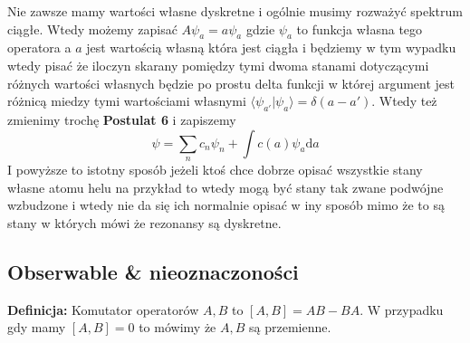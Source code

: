Nie zawsze mamy wartości własne dyskretne i ogólnie musimy rozważyć spektrum ciągłe.
Wtedy możemy zapisać $A \psi_a = a \psi_a$ gdzie $\psi_a$ to funkcja własna tego
operatora a $a$ jest wartością własną która jest ciągła i będziemy w tym wypadku wtedy pisać że iloczyn skarany pomiędzy tymi dwoma stanami dotyczącymi różnych wartości własnych będzie po prostu delta funkcji w której argument jest różnicą miedzy tymi wartościami własnymi $\langle \psi_{a'} | \psi_a  \rangle = \delta(a - a')$.
Wtedy też zmienimy trochę \textbf{Postulat 6} i zapiszemy
\begin{equation*}
	\psi = \sum_n c_n \psi_n + \int c(a) \psi_a \text{d}a
\end{equation*}
I powyższe to istotny sposób jeżeli ktoś chce dobrze opisać wszystkie stany własne atomu helu na przykład to wtedy mogą być stany tak zwane podwójne wzbudzone i wtedy nie da się ich normalnie opisać w iny sposób mimo że to są stany w których mówi że rezonansy są dyskretne.
\subsection{Obserwable \& nieoznaczoności}
\textbf{Definicja:} Komutator operatorów $A, B$ to $[A, B] = AB - BA$.
W przypadku gdy mamy $[A, B] = 0$ to mówimy że $A, B$ są przemienne.

